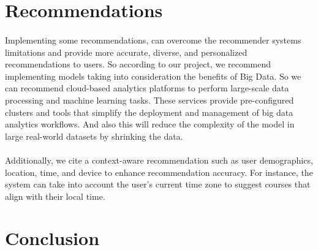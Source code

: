 \documentclass{cup-pan}
\begin{document}
\section{Recommendations}
\label{sec:overview}
\paragraph{}
Implementing some recommendations,  can overcome the recommender systems limitations and provide more accurate, diverse, and personalized recommendations to users. So according to our project, we recommend implementing models taking into consideration the benefits of Big Data. So we can recommend cloud-based analytics platforms to perform large-scale data processing and machine learning tasks. These services provide pre-configured clusters and tools that simplify the deployment and management of big data analytics workflows. And also this will reduce the complexity of the model in large real-world datasets by shrinking the data.
\paragraph{}
Additionally, we cite a context-aware recommendation such as user demographics, location, time, and device to enhance recommendation accuracy. For instance, the system can take into account the user's current time zone to suggest courses that align with their local time.


\section{Conclusion}
\label{sec:overview}
\end{document}
